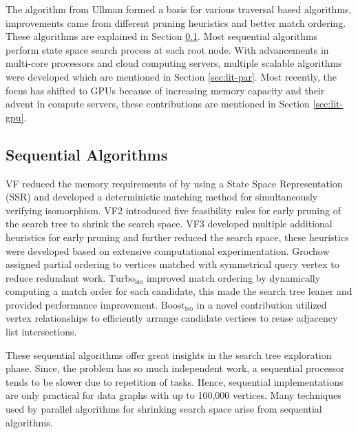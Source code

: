The algorithm from Ullman \cite{ullman_sgm} formed a basis for various traversal based algorithms, improvements came from different pruning heuristics and better match ordering. These algorithms are explained in Section \ref{sec:lit-seq}.
Most sequential algorithms perform state space search process at each root node.
With advancements in multi-core processors and cloud computing servers, multiple scalable algorithms were developed which are mentioned in Section \ref{sec:lit-par}.
Most recently, the focus has shifted to GPUs because of increasing memory capacity and their advent in compute servers, these contributions are mentioned in Section \ref{sec:lit-gpu}.

\subsection{Sequential Algorithms} \label{sec:lit-seq}
VF \cite{VF} reduced the memory requirements of \cite{ullman_sgm} by using a State Space Representation (SSR) and developed a deterministic matching method for simultaneously verifying isomorphism.
VF2 \cite{VF2} introduced five feasibility rules for early pruning of the search tree to shrink the search space.
VF3 \cite{VF3} developed multiple additional heuristics for early pruning and further reduced the search space, these heuristics were developed based on extensive computational experimentation.
Grochow \etal \cite{symbreak} assigned partial ordering to vertices matched with symmetrical query vertex to reduce redundant work.
$\text{Turbo}_{\text{iso}}$ \cite{Turbo-iso} improved match ordering by dynamically computing a match order for each candidate, this made the search tree leaner and provided performance improvement.
$\text{Boost}_{\text{iso}}$ \cite{Boost-iso} in a novel contribution utilized vertex relationships to efficiently arrange candidate vertices to reuse adjacency list intersections.

These sequential algorithms offer great insights in the search tree exploration phase.
Since, the problem has so much independent work, a sequential processor tends to be slower due to repetition of tasks.
Hence, sequential implementations are only practical for data graphs with up to 100,000 vertices.
Many techniques used by parallel algorithms for shrinking search space arise from sequential algorithms.

